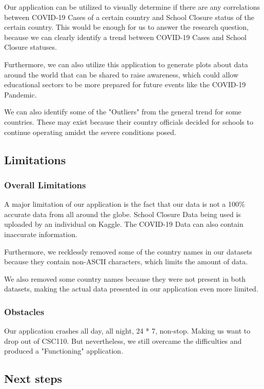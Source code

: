 \documentclass[fontsize=11pt]{article}
\begin{document}
    Our application can be utilized to visually determine if there are any correlations between COVID-19 Cases of a certain country and School Closure status of the certain country. This would be enough for us to answer the research question, because we can clearly identify a trend between COVID-19 Cases and School Closure statuses.

    Furthermore, we can also utilize this application to generate plots about data around the world that can be shared to raise awareness, which could allow educational sectors to be more prepared for future events like the COVID-19 Pandemic.

    We can also identify some of the "Outliers" from the general trend for some countries. These may exist because their country officials decided for schools to continue operating amidst the severe conditions posed.

    \subsection{Limitations}

    \subsubsection{Overall Limitations}

    A major limitation of our application is the fact that our data is not a 100\% accurate data from all around the globe. School Closure Data being used is uploaded by an individual on Kaggle. The COVID-19 Data can also contain inaccurate information.

    Furthermore, we recklessly removed some of the country names in our datasets because they contain non-ASCII characters, which limits the amount of data.

    We also removed some country names because they were not present in both datasets, making the actual data presented in our application even more limited.

    \subsubsection{Obstacles}

    Our application crashes all day, all night, 24 * 7, non-stop. Making us want to drop out of CSC110. But nevertheless, we still overcame the difficulties and produced a "Functioning" application.

    \subsection{Next steps}
\end{document}
